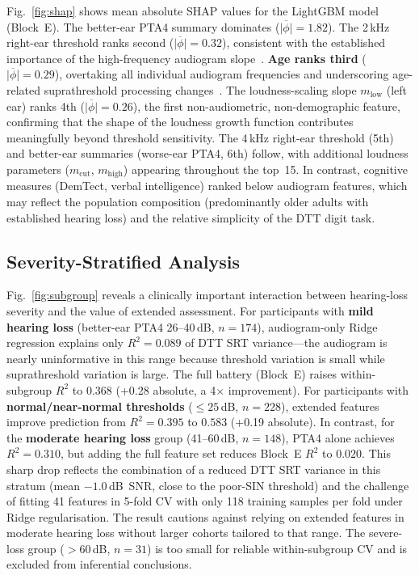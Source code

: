 \documentclass[conference]{IEEEtran}
\begin{document}
Fig.~\ref{fig:shap} shows mean absolute SHAP values for the LightGBM model
(Block~E).  The better-ear PTA4 summary dominates ($\overline{|\phi|}=1.82$).
The 2\,kHz right-ear threshold ranks second ($\overline{|\phi|}=0.32$),
consistent with the established importance of the high-frequency audiogram
slope~\cite{vanRooij1990HL}.  \textbf{Age ranks third}
($\overline{|\phi|}=0.29$), overtaking all individual audiogram
frequencies and underscoring age-related suprathreshold processing
changes~\cite{Wingfield2005AgeSIN}.  The loudness-scaling slope
$m_\text{low}$ (left ear) ranks 4th ($\overline{|\phi|}=0.26$), the
first non-audiometric, non-demographic feature, confirming that the
shape of the loudness growth function contributes meaningfully beyond
threshold sensitivity.  The 4\,kHz right-ear threshold (5th) and
better-ear summaries (worse-ear PTA4, 6th) follow, with additional
loudness parameters ($m_\text{cut}$, $m_\text{high}$) appearing
throughout the top~15.  In
contrast, cognitive measures (DemTect, verbal intelligence) ranked below
audiogram features, which may reflect the population composition
(predominantly older adults with established hearing loss) and the
relative simplicity of the DTT digit task.

\subsection{Severity-Stratified Analysis}

Fig.~\ref{fig:subgroup} reveals a clinically important interaction between
hearing-loss severity and the value of extended assessment.  For participants
with \textbf{mild hearing loss} (better-ear PTA4 26--40\,dB, $n=174$),
audiogram-only Ridge regression explains only $R^2=0.089$ of DTT SRT
variance---the audiogram is nearly uninformative in this range because
threshold variation is small while suprathreshold variation is large.
The full battery (Block~E) raises within-subgroup $R^2$ to $0.368$
(+0.28 absolute, a 4$\times$ improvement).  For participants with
\textbf{normal/near-normal thresholds} (${\leq}25$\,dB, $n=228$), extended
features improve prediction from $R^2=0.395$ to $0.583$ (+0.19 absolute).
In contrast, for the \textbf{moderate hearing loss} group (41--60\,dB,
$n=148$), PTA4 alone achieves $R^2=0.310$, but adding the full feature
set reduces Block~E $R^2$ to $0.020$.  This sharp drop reflects the
combination of a reduced DTT SRT variance in this stratum
(mean $-1.0$\,dB~SNR, close to the poor-SIN threshold) and the challenge
of fitting 41 features in 5-fold CV with only 118 training samples per fold
under Ridge regularisation.  The result cautions against relying on
extended features in moderate hearing loss without larger cohorts tailored
to that range.  The severe-loss group ($>60$\,dB, $n=31$) is too small
for reliable within-subgroup CV and is excluded from inferential
conclusions.
\end{document}
